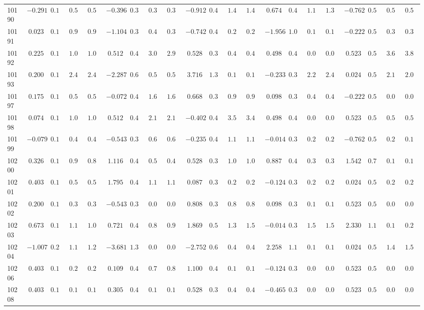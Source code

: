 \documentclass[6pt]{article}
\begin{document}
\begin{landscape}
{\begin{longtable}{lrrrrrrrrrrrrrrrrrrrr}
10190&$-0.291$&$0.166$&$0.595$&$0.593$&$-0.396$&$0.395$&$0.398$&$0.393$&$-0.912$&$0.418$&$1.482$&$1.470$&$ 0.674$&$0.445$&$1.164$&$1.371$&$-0.762$&$0.547$&$0.586$&$0.586$\tabularnewline
10191&$ 0.023$&$0.160$&$0.952$&$0.964$&$-1.104$&$0.391$&$0.400$&$0.381$&$-0.742$&$0.415$&$0.211$&$0.212$&$-1.956$&$1.082$&$0.145$&$0.149$&$-0.222$&$0.517$&$0.323$&$0.344$\tabularnewline
10192&$ 0.225$&$0.160$&$1.019$&$1.005$&$ 0.512$&$0.443$&$3.013$&$2.969$&$ 0.528$&$0.384$&$0.461$&$0.462$&$ 0.498$&$0.411$&$0.014$&$0.015$&$ 0.523$&$0.538$&$3.664$&$3.845$\tabularnewline
10193&$ 0.200$&$0.160$&$2.406$&$2.445$&$-2.287$&$0.601$&$0.524$&$0.561$&$ 3.716$&$1.382$&$0.102$&$0.107$&$-0.233$&$0.355$&$2.258$&$2.442$&$ 0.024$&$0.513$&$2.149$&$2.043$\tabularnewline
10197&$ 0.175$&$0.160$&$0.583$&$0.584$&$-0.072$&$0.416$&$1.626$&$1.626$&$ 0.668$&$0.384$&$0.926$&$0.923$&$ 0.098$&$0.359$&$0.473$&$0.459$&$-0.222$&$0.517$&$0.021$&$0.023$\tabularnewline
10198&$ 0.074$&$0.160$&$1.088$&$1.079$&$ 0.512$&$0.443$&$2.179$&$2.148$&$-0.402$&$0.408$&$3.557$&$3.492$&$ 0.498$&$0.411$&$0.014$&$0.015$&$ 0.523$&$0.538$&$0.525$&$0.577$\tabularnewline
10199&$-0.079$&$0.161$&$0.411$&$0.400$&$-0.543$&$0.389$&$0.639$&$0.666$&$-0.235$&$0.404$&$1.112$&$1.103$&$-0.014$&$0.353$&$0.212$&$0.207$&$-0.762$&$0.547$&$0.205$&$0.198$\tabularnewline
10200&$ 0.326$&$0.161$&$0.902$&$0.869$&$ 1.116$&$0.430$&$0.521$&$0.497$&$ 0.528$&$0.384$&$1.087$&$1.095$&$ 0.887$&$0.493$&$0.390$&$0.351$&$ 1.542$&$0.765$&$0.184$&$0.130$\tabularnewline
10201&$ 0.403$&$0.162$&$0.561$&$0.568$&$ 1.795$&$0.408$&$1.147$&$1.163$&$ 0.087$&$0.394$&$0.265$&$0.263$&$-0.124$&$0.351$&$0.208$&$0.204$&$ 0.024$&$0.513$&$0.258$&$0.245$\tabularnewline
10202&$ 0.200$&$0.160$&$0.369$&$0.382$&$-0.543$&$0.389$&$0.077$&$0.071$&$ 0.808$&$0.387$&$0.845$&$0.861$&$ 0.098$&$0.359$&$0.153$&$0.164$&$ 0.523$&$0.538$&$0.021$&$0.020$\tabularnewline
10203&$ 0.673$&$0.171$&$1.183$&$1.072$&$ 0.721$&$0.443$&$0.865$&$0.902$&$ 1.869$&$0.531$&$1.313$&$1.584$&$-0.014$&$0.353$&$1.566$&$1.531$&$ 2.330$&$1.198$&$0.174$&$0.222$\tabularnewline
10204&$-1.007$&$0.205$&$1.102$&$1.272$&$-3.681$&$1.306$&$0.087$&$0.095$&$-2.752$&$0.671$&$0.419$&$0.418$&$ 2.258$&$1.137$&$0.144$&$0.139$&$ 0.024$&$0.513$&$1.477$&$1.543$\tabularnewline
10206&$ 0.403$&$0.162$&$0.267$&$0.279$&$ 0.109$&$0.427$&$0.786$&$0.800$&$ 1.100$&$0.404$&$0.115$&$0.116$&$-0.124$&$0.351$&$0.081$&$0.081$&$ 0.523$&$0.538$&$0.021$&$0.020$\tabularnewline
10208&$ 0.403$&$0.162$&$0.126$&$0.130$&$ 0.305$&$0.437$&$0.108$&$0.111$&$ 0.528$&$0.384$&$0.445$&$0.449$&$-0.465$&$0.378$&$0.035$&$0.037$&$ 0.523$&$0.538$&$0.021$&$0.020$\tabularnewline

\end{longtable}}
\end{landscape}
\end{document}
